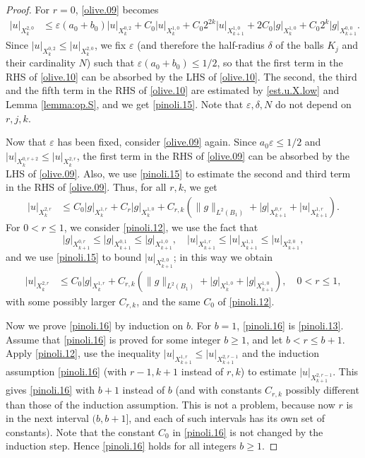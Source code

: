 \documentclass[10pt,a4paper]{amsart}
\newcommand{\e}{\varepsilon}
\begin{document}
\begin{proof}
For $r=0$, \eqref{olive.09} becomes
\begin{align}
|u|_{X^{2,0}_k}
& \leq \e (a_0 + b_0) |u|_{X^{0,2}_k}
+ C_0 |u|_{X^{1,0}_k}
+ C_0 2^{2k} |u|_{X^{1,0}_{k+1}}
+ 2 C_0 |g|_{X^{1,0}_k}
+ C_0 2^k |g|_{X^{0,0}_{k+1}}.
\label{olive.10}
\end{align}
Since $|u|_{X^{0,2}_k} \leq |u|_{X^{2,0}_k}$, 
we fix $\e$ (and therefore the half-radius $\delta$ of the balls $K_j$ 
and their cardinality $N$) 
such that $\e (a_0 + b_0) \leq 1/2$,
so that the first term in the RHS of \eqref{olive.10} can be absorbed 
by the LHS of \eqref{olive.10}. 
The second, the third and the fifth term in the RHS of \eqref{olive.10} are estimated 
by \eqref{est.u.X.low} and Lemma \ref{lemma:op.S}, and we get \eqref{pinoli.15}. 
Note that $\e, \delta, N$ do not depend on $r,j,k$. 

Now that $\e$ has been fixed, consider \eqref{olive.09} again. 
Since $a_0 \e \leq 1/2$ and $|u|_{X^{0,r+2}_k} \leq |u|_{X^{2,r}_k}$, 
the first term in the RHS of \eqref{olive.09} can be absorbed by the LHS of \eqref{olive.09}.  
Also, we use \eqref{pinoli.15} to estimate the second and third term in the RHS of \eqref{olive.09}. 
Thus, for all $r,k$, we get
\begin{align}
|u|_{X^{2,r}_k}
& \leq 
C_0 |g|_{X^{1,r}_k} + C_r |g|_{X^{1,0}_k} 
+ C_{r,k} (\| g \|_{L^2(B_1)} + |g|_{X^{0,r}_{k+1}} + |u|_{X^{1,r}_{k+1}} ).
\label{pinoli.12}
\end{align}
For $0 < r \leq 1$, we consider \eqref{pinoli.12}, 
we use the fact that 
\[
|g|_{X^{0,r}_{k+1}} \leq 
|g|_{X^{0,1}_{k+1}} \leq 
|g|_{X^{1,0}_{k+1}}, 
\quad 
|u|_{X^{1,r}_{k+1}} 
\leq |u|_{X^{1,1}_{k+1}}
\leq |u|_{X^{2,0}_{k+1}},
\]
and we use \eqref{pinoli.15} to bound $|u|_{X^{2,0}_{k+1}}$; 
in this way we obtain 
\begin{align}
|u|_{X^{2,r}_k} 
& \leq 
C_0 |g|_{X^{1,r}_k}
+ C_{r,k} (\| g \|_{L^2(B_1)} + |g|_{X^{1,0}_k} + |g|_{X^{1,0}_{k+1}}), 
\quad 0 < r \leq 1,
\label{pinoli.13}
\end{align}
with some possibly larger $C_{r,k}$, and the same $C_0$ of \eqref{pinoli.12}. 

Now we prove \eqref{pinoli.16} by induction on $b$. 
For $b=1$, \eqref{pinoli.16} is \eqref{pinoli.13}. 
Assume that \eqref{pinoli.16} is proved for some integer $b \geq 1$, 
and let $b < r \leq b+1$. 
Apply \eqref{pinoli.12}, 
use the inequality $|u|_{X^{1,r}_{k+1}} \leq |u|_{X^{2,r-1}_{k+1}}$
and the induction assumption \eqref{pinoli.16} (with $r-1, k+1$ instead of $r,k$)
to estimate $|u|_{X^{2,r-1}_{k+1}}$. This gives \eqref{pinoli.16} with $b+1$ instead of $b$ 
(and with constants $C_{r,k}$ possibly different than those of the induction assumption. 
This is not a problem, because now $r$ is in the next interval $(b, b+1]$, 
and each of such intervals has its own set of constants). 
Note that the constant $C_0$ in \eqref{pinoli.16} is not changed by the induction step. 
Hence \eqref{pinoli.16} holds for all integers $b \geq 1$. 
\end{proof}
\end{document}
